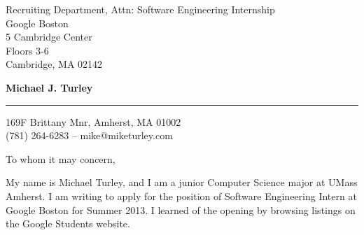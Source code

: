 \documentclass{letter} %
\begin{document}
\signature{Michael J. Turley}           %
\longindentation=0pt                       %
\let\raggedleft\raggedright                %
 
 
\begin{letter}{Recruiting Department, Attn: Software Engineering Internship \\
Google Boston \\
5 Cambridge Center \\
Floors 3-6 \\
Cambridge, MA 02142}


\begin{flushleft}
{\LARGE\bf Michael J. Turley}
\end{flushleft}
\medskip\hrule height 1pt
\begin{flushright}
\hfill 169F Brittany Mnr, Amherst, MA 01002 \\
\hfill (781) 264-6283  --  mike@miketurley.com
\end{flushright} 
\vfill %

 
\opening{To whom it may concern,} 
 

\noindent My name is Michael Turley, and I am a junior Computer Science major at UMass Amherst.  I am writing to apply for the position of Software Engineering Intern at Google Boston for Summer 2013.  I learned of the opening by browsing listings on the Google Students website.
 


\end{letter}
\end{document}

